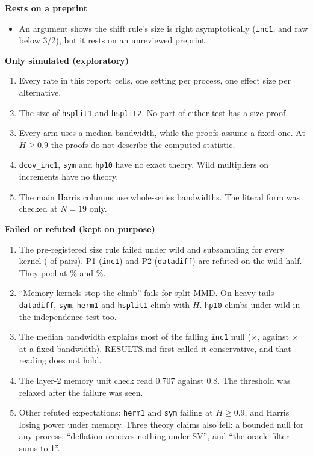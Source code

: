 \documentclass[11pt,a4paper]{article}
\newcommand{\kn}[1]{\texttt{#1}}
\begin{document}
\textbf{Rests on a preprint}
\begin{itemize}
\item An argument shows the shift rule's size is right asymptotically (\kn{inc1}, and raw below 3/2), but it rests on an unreviewed preprint.
\end{itemize}

\textbf{Only simulated (exploratory)}
\begin{enumerate}
\item Every rate in this report:  cells, one setting per process, one effect size per alternative.
\item The size of \kn{hsplit1} and \kn{hsplit2}. No part of either test has a size proof.
\item Every arm uses a median bandwidth, while the proofs assume a fixed one. At $H \ge 0.9$ the proofs do not describe the computed statistic.
\item \kn{dcov\_inc1}, \kn{sym} and \kn{hp10} have no exact theory. Wild multipliers on increments have no theory.
\item The main Harris columns use whole-series bandwidths. The literal form was checked at $N = 19$ only.
\end{enumerate}

\textbf{Failed or refuted (kept on purpose)}
\begin{enumerate}
\item The pre-registered size rule failed under wild and subsampling for every kernel ( of  pairs).
  P1 (\kn{inc1}) and P2 (\kn{datadiff}) are refuted on the wild half. They pool at \% and \%.
\item ``Memory kernels stop the climb'' fails for split MMD. On heavy tails \kn{datadiff}, \kn{sym}, \kn{herm1} and \kn{hsplit1} climb with $H$.
  \kn{hp10} climbs under wild in the independence test too.
\item The median bandwidth explains most of the falling \kn{inc1} null ($\times$, against $\times$ at a fixed bandwidth).
  RESULTS.md first called it conservative, and that reading does not hold.
\item The layer-2 memory unit check read 0.707 against 0.8. The threshold was relaxed after the failure was seen.
\item Other refuted expectations: \kn{herm1} and \kn{sym} failing at $H \ge 0.9$, and Harris losing power under memory.
  Three theory claims also fell: a bounded null for any process, ``deflation removes nothing under SV'', and ``the oracle filter sums to 1''.
\end{enumerate}
\end{document}
